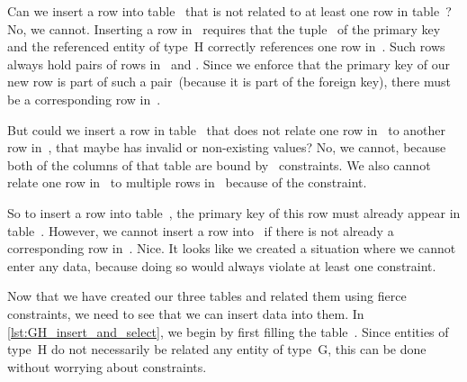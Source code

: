 Can we insert a row into table~ that is not related to at least one row in table~?
No, we cannot.
Inserting a row in~ requires that the tuple~ of the primary key~ and the referenced entity of type~H correctly references one row in~.
Such rows always hold pairs of rows in~ and .
Since we enforce that the primary key of our new row is part of such a pair~(because it is part of the foreign key), there must be a corresponding row in~.

But could we insert a row in table~ that does not relate one row in~ to another row in~, that maybe has invalid or non-existing values?
No, we cannot, because both of the columns of that table are bound by~ constraints.
We also cannot relate one row in~ to multiple rows in~ because of the  constraint.%
%
\begin{sloppypar}%
So to insert a row into table~, the primary key of this row must already appear in table~.
However, we cannot insert a row into~ if there is not already a corresponding row in~.
Nice.
It looks like we created a situation where we cannot enter any data, because doing so would always violate at least one constraint.%
\end{sloppypar}%
%
Now that we have created our three tables and related them using fierce constraints, we need to see that we can insert data into them.
In \cref{lst:GH_insert_and_select}, we begin by first filling the table~.
Since entities of type~H do not necessarily be related any entity of type~G, this can be done without worrying about constraints.


